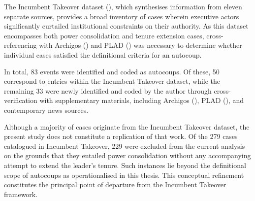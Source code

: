 \documentclass[
  12pt,
]{report}
\begin{document}
The Incumbent Takeover dataset (), which synthesises information from eleven separate
sources, provides a broad inventory of cases wherein executive actors
significantly curtailed institutional constraints on their authority. As
this dataset encompasses both power consolidation and tenure extension
cases, cross-referencing with Archigos
() and
PLAD () was
necessary to determine whether individual cases satisfied the
definitional criteria for an autocoup.

\begin{table}

\caption{\label{tbl-source}Main Data Sources for Coding the Autocoup
Dataset}


\end{table}%

In total, 83 events were identified and coded as autocoups. Of these, 50
correspond to entries within the Incumbent Takeover dataset, while the
remaining 33 were newly identified and coded by the author through
cross-verification with supplementary materials, including Archigos
(), PLAD
(), and
contemporary news sources.

Although a majority of cases originate from the Incumbent Takeover
dataset, the present study does not constitute a replication of that
work. Of the 279 cases catalogued in Incumbent Takeover, 229 were
excluded from the current analysis on the grounds that they entailed
power consolidation without any accompanying attempt to extend the
leader's tenure. Such instances lie beyond the definitional scope of
autocoups as operationalised in this thesis. This conceptual refinement
constitutes the principal point of departure from the Incumbent Takeover
framework.
\end{document}

